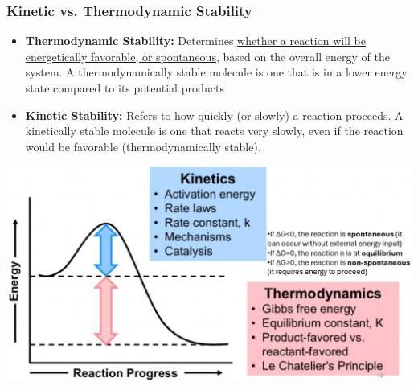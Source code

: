 \documentclass[10pt]{article}
\begin{document}
\subsubsection*{Kinetic vs. Thermodynamic Stability}
\begin{itemize}
    \item \textbf{Thermodynamic Stability:} Determines \underline{whether a reaction will be energetically favorable, or spontaneous}, based on the overall energy of the system.  A thermodynamically stable molecule is one that is in a lower energy state compared to its potential products
    \item \textbf{Kinetic Stability:} Refers to how \underline{quickly (or slowly) a reaction proceeds}.  A kinetically stable molecule is one that reacts very slowly, even if the reaction would be favorable (thermodynamically stable).
\end{itemize}
\begin{center}
    \includegraphics*[width=\textwidth]{L2_1.png}
\end{center}
\end{document}
